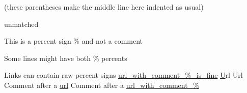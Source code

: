 \documentclass{article}
\begin{document}
(these parentheses
  make the middle line here
indented as usual)


unmatched %

This is a percent sign \% and not a comment

Some lines might have both \% percents %

Links can contain raw percent signs
\url{url_with_comment_%_is_fine}
\href{href_with_comment_%_is_fine}
Url %
Url %
Comment after a \url{url} %
Comment after a \url{url_with_comment_%} %
\end{document}
